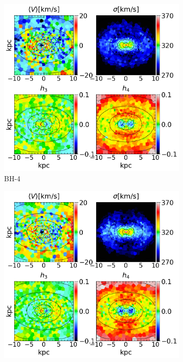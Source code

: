 \documentclass[english, oneside]{HYgradu}
\begin{document}
\begin{figure}
	\centering
	\begin{subfigure}[b]{0.49\textwidth}
		\includegraphics[width=\textwidth]{BH_4.png}
		\caption{BH-4}
	\end{subfigure}
	\begin{subfigure}[b]{0.49\textwidth}
		\includegraphics[width=\textwidth]{BH_5.png}

\end{subfigure}
\end{figure}
\end{document}
